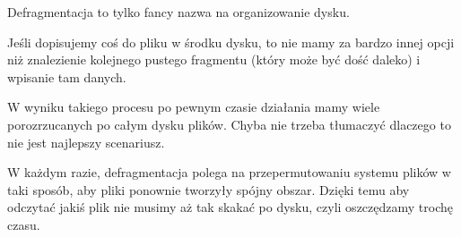 Defragmentacja to tylko fancy nazwa na organizowanie dysku.

Jeśli dopisujemy coś do pliku w środku dysku, to nie mamy za bardzo innej opcji niż znalezienie kolejnego pustego fragmentu (który może być dość daleko) i wpisanie tam danych.

W wyniku takiego procesu po pewnym czasie działania mamy wiele porozrzucanych po całym dysku plików. Chyba nie trzeba tłumaczyć dlaczego to nie jest najlepszy scenariusz.

W każdym razie, defragmentacja polega na przepermutowaniu systemu plików w taki sposób, aby pliki ponownie tworzyły spójny obszar. Dzięki temu aby odczytać jakiś plik nie musimy aż tak skakać po dysku, czyli oszczędzamy trochę czasu.
